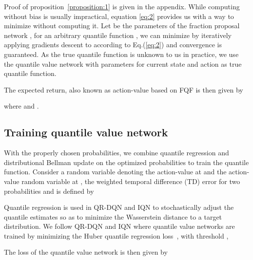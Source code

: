 \documentclass{article}
\begin{document}
Proof of proposition~\ref{proposition:1} is given in the appendix. While computing  without bias is usually impractical, equation \ref{eq:2} provides us with a way to minimize  without computing it. Let  be the parameters of the fraction proposal network , for an arbitrary quantile function , we can minimize  by iteratively applying gradients descent to  according to Eq.(\ref{eq:2}) and convergence is guaranteed. As the true quantile function  is unknown to us in practice, we use the quantile value network  with parameters  for current state and action as true quantile function. 

\iffalse
Denote the -th output of the fraction proposal network  that takes  as input by  and for simplicity . Following equation \ref{eq:2} the gradient for the output of network  is given by

where  is the random variable denoting the action-value at . 

Then the loss of  is given by

where  is the random variable denoting the action-value at , a toy case using  to approximate a known distribution is given in the appendix. By minimizing , we train the fraction proposal network to obtain the optimal probabilities  that minimizes Eq.(\ref{objective}).
\fi

The expected return, also known as action-value based on FQF is then given by

where  and .

\subsection{Training quantile value network}
With the properly chosen probabilities, we combine quantile regression and distributional Bellman update on the optimized probabilities to train the quantile function. Consider  a random variable denoting the action-value at  and  the action-value random variable at , the weighted temporal difference (TD) error for two probabilities  and  is defined by


Quantile regression is used in QR-DQN and IQN to stochastically adjust the quantile estimates so as to minimize the Wasserstein distance to a target distribution. We follow QR-DQN and IQN where quantile value networks are trained by minimizing the Huber quantile regression loss~\citep{huber:1964}, with threshold ,



The loss of the quantile value network is then given by
\end{document}
